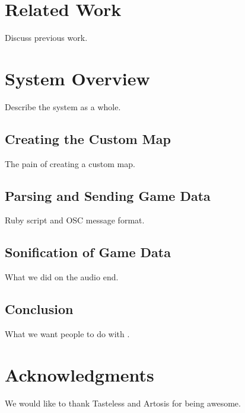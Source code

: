 \documentclass{nime-document-class}
\begin{document}
\section{Related Work}
Discuss previous work.

\section{System Overview}
Describe the system as a whole.

\subsection{Creating the Custom Map}
The pain of creating a custom map.

\subsection{Parsing and Sending Game Data}
Ruby script and OSC message format.

\subsection{Sonification of Game Data}
What we did on the audio end.

\subsection{Conclusion}
What we want people to do with \projectName{}.

\section{Acknowledgments}
We would like to thank Tasteless and Artosis for being awesome.

\end{document}
